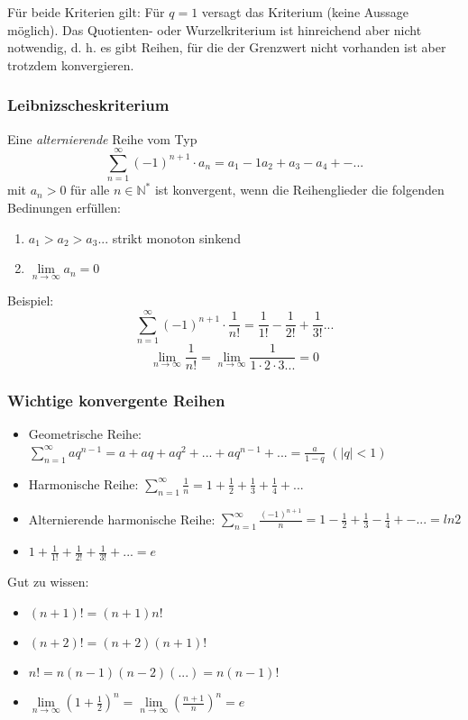 Für beide Kriterien gilt: Für \(q = 1\) versagt das Kriterium (keine Aussage möglich). Das Quotienten- oder Wurzelkriterium ist hinreichend aber nicht notwendig, d. h. es gibt Reihen, für die der Grenzwert nicht vorhanden ist aber trotzdem konvergieren.

\subsubsection*{Leibnizscheskriterium}
\begin{definition}Eine \textit{alternierende} Reihe vom Typ
$$ \sum\limits_{n=1}^{\infty} (-1)^{n+1} \cdot a_n = a_1 -1 a_2 + a_3 - a_4 + - ...$$
mit $a_n > 0$ für alle $n \in \mathbb{N}^*$ ist konvergent, wenn die Reihenglieder die folgenden Bedinungen erfüllen:
\begin{enumerate}
	\item $a_1 > a_2 > a_3 ...$ strikt monoton sinkend
	\item $\lim\limits_{n \rightarrow \infty} a_n = 0$
\end{enumerate}
\end{definition}

Beispiel:
$$ \sum\limits_{n=1}^{\infty} (-1)^{n+1} \cdot \frac{1}{n!}  = \frac{1}{1!} - \frac{1}{2!} + \frac{1}{3!} ... $$ 
$$ \lim\limits_{n\rightarrow \infty} \frac{1}{n!} = \lim\limits_{n\rightarrow \infty} \frac{1}{1 \cdot 2 \cdot 3 ...} = 0$$

\subsubsection*{Wichtige konvergente Reihen}
\begin{itemize}
	\item Geometrische Reihe: \\$\sum\limits_{n=1}^{\infty} aq^{n-1} = a + aq + aq^2 + ... + aq^{n-1} + ... = \frac{a}{1-q}$  $(|q| <1)$
	\item Harmonische Reihe: $\sum\limits_{n=1}^{\infty} \frac{1}{n} = 1 + \frac{1}{2} + \frac{1}{3} + \frac{1}{4} + ...$
	\item Alternierende harmonische Reihe: $\sum\limits_{n=1}^{\infty} \frac{(-1)^{n+1}}{n} = 1 - \frac{1}{2} + \frac{1}{3} - \frac{1}{4} + - ... = ln{2}$
	\item $1 + \frac{1}{1!} + \frac{1}{2!}+\frac{1}{3!} + ... = e$
\end{itemize}
Gut zu wissen:
\begin{itemize}
	\item $(n+1)! = (n+1)n!$
	\item $(n+2)! = (n+2)(n+1)!$
	\item $n! = n(n-1)(n-2)(...) = n(n-1)!$
	\item $\lim\limits_{n \rightarrow \infty}(1+\frac{1}{2})^n = \lim\limits_{n \rightarrow \infty}\left(\frac{n+1}{n}\right)^n = e $
\end{itemize}

